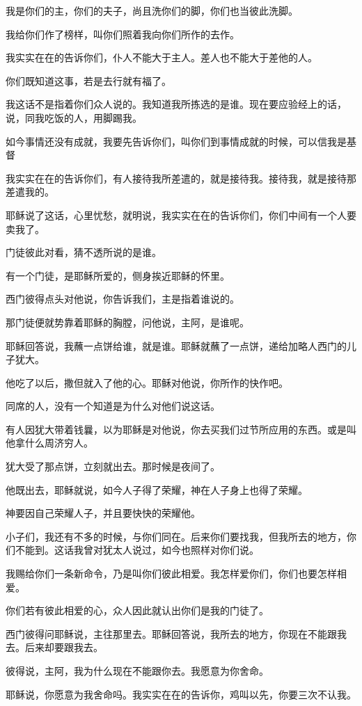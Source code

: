 \documentclass[12pt,oneside]{book}
\begin{document}
我是你们的主，你们的夫子，尚且洗你们的脚，你们也当彼此洗脚。

我给你们作了榜样，叫你们照着我向你们所作的去作。

我实实在在的告诉你们，仆人不能大于主人。差人也不能大于差他的人。

你们既知道这事，若是去行就有福了。

我这话不是指着你们众人说的。我知道我所拣选的是谁。现在要应验经上的话，说，同我吃饭的人，用脚踢我。

如今事情还没有成就，我要先告诉你们，叫你们到事情成就的时候，可以信我是基督

我实实在在的告诉你们，有人接待我所差遣的，就是接待我。接待我，就是接待那差遣我的。

耶稣说了这话，心里忧愁，就明说，我实实在在的告诉你们，你们中间有一个人要卖我了。

门徒彼此对看，猜不透所说的是谁。

有一个门徒，是耶稣所爱的，侧身挨近耶稣的怀里。

西门彼得点头对他说，你告诉我们，主是指着谁说的。

那门徒便就势靠着耶稣的胸膛，问他说，主阿，是谁呢。

耶稣回答说，我蘸一点饼给谁，就是谁。耶稣就蘸了一点饼，递给加略人西门的儿子犹大。

他吃了以后，撒但就入了他的心。耶稣对他说，你所作的快作吧。

同席的人，没有一个知道是为什么对他们说这话。

有人因犹大带着钱曩，以为耶稣是对他说，你去买我们过节所应用的东西。或是叫他拿什么周济穷人。

犹大受了那点饼，立刻就出去。那时候是夜间了。

他既出去，耶稣就说，如今人子得了荣耀，神在人子身上也得了荣耀。

神要因自己荣耀人子，并且要快快的荣耀他。

小子们，我还有不多的时候，与你们同在。后来你们要找我，但我所去的地方，你们不能到。这话我曾对犹太人说过，如今也照样对你们说。

我赐给你们一条新命令，乃是叫你们彼此相爱。我怎样爱你们，你们也要怎样相爱。

你们若有彼此相爱的心，众人因此就认出你们是我的门徒了。

西门彼得问耶稣说，主往那里去。耶稣回答说，我所去的地方，你现在不能跟我去。后来却要跟我去。

彼得说，主阿，我为什么现在不能跟你去。我愿意为你舍命。

耶稣说，你愿意为我舍命吗。我实实在在的告诉你，鸡叫以先，你要三次不认我。
\end{document}
